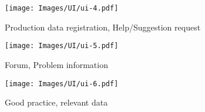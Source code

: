 
\begin{figure}[H]
	\centering
    \texttt{[image: Images/UI/ui-4.pdf]}
	\caption{\label{fig:ui_production}Production data registration, Help/Suggestion request}
\end{figure}
\newpage
\begin{figure}[H]
	\centering
    \texttt{[image: Images/UI/ui-5.pdf]}
	\caption{\label{fig:ui_forum}Forum, Problem information}
\end{figure}

\begin{figure}[H]
	\centering
    \texttt{[image: Images/UI/ui-6.pdf]}
	\caption{\label{fig:ui_practice}Good practice, relevant data}
\end{figure}